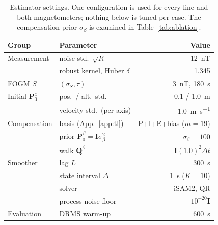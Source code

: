 
\begin{table}[t]
\caption{Estimator settings. One configuration is used for every line and both
magnetometers; nothing below is tuned per case. The compensation prior
$\sigma_{\beta}$ is examined in Table~\ref{tab:ablation}.}
\label{tab:params}
\centering
\footnotesize
\setlength{\tabcolsep}{3pt}
\begin{tabular}{@{}llr@{}}
\toprule
Group & Parameter & Value \\
\midrule
Measurement & noise std.\ $\sqrt{R}$ & \SI{12}{\nano\tesla} \\
 & robust kernel, Huber $\delta$ & 1.345 \\
FOGM $S$ & $(\sigma_S,\tau)$ & \SI{3}{\nano\tesla}, \SI{180}{\second} \\
Initial $\mathbf{P}_0^{x}$ & pos.\ / alt.\ std. & \SI{0.1}{} / \SI{1.0}{\meter} \\
 & velocity std.\ (per axis) & \SI{1.0}{\meter\per\second} \\
Compensation & basis (App.~\ref{app:tl}) & P{+}I{+}E{+}bias ($m=19$) \\
 & prior $\mathbf{P}_0^{\beta}=\mathbf{I}\sigma_{\beta}^2$ & $\sigma_{\beta}=100$ \\
 & walk $\mathbf{Q}^{\beta}$ & $\mathbf{I}(1.0)^2\Delta t$ \\
Smoother & lag $L$ & \SI{300}{\second} \\
 & state interval $\Delta$ & \SI{1}{\second} ($K=10$) \\
 & solver & iSAM2, QR \\
 & process-noise floor & $10^{-20}\mathbf{I}$ \\
Evaluation & DRMS warm-up & \SI{600}{\second} \\
\bottomrule
\end{tabular}
\end{table}

